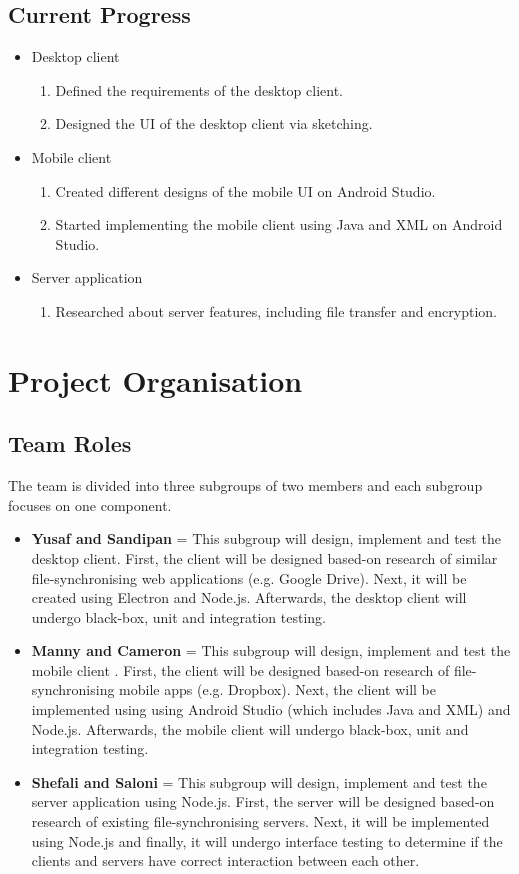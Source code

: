 \documentclass{article}
\begin{document}
	\subsection{Current Progress}
	\begin{itemize}
	\item Desktop client
		\begin{enumerate}
		\item Defined the requirements of the desktop client.
		\item Designed the UI of the desktop client via sketching.
		\end{enumerate}
	\item Mobile client
		\begin{enumerate}
		\item Created different designs of the mobile UI on Android Studio.
		\item Started implementing the mobile client using Java and XML on Android Studio.  
		\end{enumerate}
	\item Server application
		\begin{enumerate}
		\item Researched about server features, including file transfer and encryption.
		\end{enumerate}
	\end{itemize}

\section{Project Organisation}
	\subsection{Team Roles}
	The team is divided into three subgroups of two members and each subgroup focuses on one component.
	\begin{itemize}
	\item \textbf{Yusaf and Sandipan} = This subgroup will design, implement and test the desktop client. First, the client will be designed based-on research of similar file-synchronising web applications (e.g. Google Drive). Next, it will be created using Electron and Node.js. Afterwards, the desktop client will undergo black-box, unit and integration testing. 
	\item \textbf{Manny and Cameron} = This subgroup will  design, implement and test the mobile client . First, the client will be designed based-on research of file-synchronising mobile apps (e.g. Dropbox). Next, the client will be implemented using using Android Studio (which includes Java and XML) and Node.js.  Afterwards, the mobile client will undergo black-box, unit and integration testing.
	\item \textbf{Shefali and Saloni} = This subgroup will design, implement and test the server application using Node.js. First, the server will be designed based-on research of existing file-synchronising servers. Next, it will be implemented using Node.js and finally, it will undergo interface testing to determine if the clients and servers have correct interaction between each other.
	\end{itemize}
\end{document}
